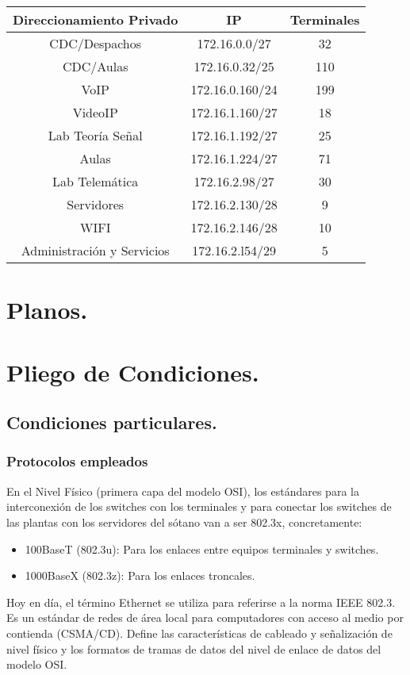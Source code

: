 \documentclass[a4paper,10pt]{article}
\begin{document}
\begin{tabular}{|c|c|c|}
\hline  \textbf{Direccionamiento Privado} & IP & Terminales \\ 
\hline  CDC/Despachos & 172.16.0.0/27 & 32 \\ 
\hline  CDC/Aulas & 172.16.0.32/25 & 110 \\ 
\hline  VoIP & 172.16.0.160/24 & 199 \\ 
\hline  VideoIP & 172.16.1.160/27 & 18 \\ 
\hline  Lab Teoría Señal & 172.16.1.192/27 & 25 \\ 
\hline  Aulas & 172.16.1.224/27 & 71 \\ 
\hline  Lab Telemática & 172.16.2.98/27 & 30 \\ 
\hline  Servidores & 172.16.2.130/28 & 9 \\ 
\hline  WIFI & 172.16.2.146/28 & 10 \\ 
\hline  Administración y Servicios & 172.16.2.l54/29 & 5 \\ 
\hline 
\end{tabular} 
\section{Planos.}
\section{Pliego de Condiciones.}
\subsection{Condiciones particulares.}
\subsubsection{Protocolos empleados}
En el Nivel Físico (primera capa del modelo OSI), los estándares para la interconexión de los switches con los terminales y para conectar los switches de las plantas con  los servidores del sótano van a ser
802.3x, concretamente:
\begin{itemize}
	\item 100BaseT (802.3u): Para los enlaces entre equipos terminales y switches.
	\item 1000BaseX (802.3z): Para los enlaces troncales.
\end{itemize}
 
Hoy en día, el término Ethernet se utiliza para referirse a la norma IEEE 802.3. Es un estándar de redes de área local para computadores con acceso al medio por contienda (CSMA/CD). Define las características de cableado y señalización de nivel físico y los formatos de tramas de datos del nivel de enlace de datos del modelo OSI.
\end{document}
